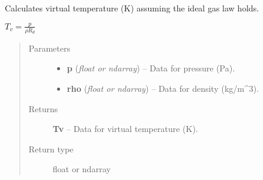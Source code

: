 \documentclass[letterpaper,10pt,english]{sphinxmanual}
\begin{document}

\begin{fulllineitems}
\label{atmos:atmos.equations.Tv_from_p_rho_ideal_gas}
Calculates virtual temperature (K) assuming the ideal gas law holds.

\(T_v = \frac{p}{\rho R_d}\)
\begin{quote}\begin{description}
\item[{Parameters}] \leavevmode\begin{itemize}
\item {} 
\textbf{p} (\emph{float or ndarray}) -- Data for pressure (Pa).

\item {} 
\textbf{rho} (\emph{float or ndarray}) -- Data for density (kg/m\textasciicircum{}3).

\end{itemize}

\item[{Returns}] \leavevmode
\textbf{Tv} --
Data for virtual temperature (K).

\item[{Return type}] \leavevmode
float or ndarray

\end{description}\end{quote}

\end{fulllineitems}

\end{document}
